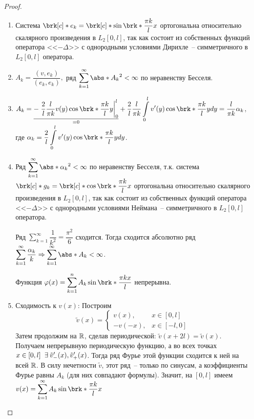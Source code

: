 \begin{proof}
	\begin{enumerate}
		\item Система $\brk[c]*{e_k} = \brk[c]*{\sin\brk*{\dfrac{\pi k}{l}x}}$ ортогональна относительно скалярного произведения в $L_2 [0,l]$, так как состоит из собственных функций оператора <<$-\Delta$>> с однородными условиями Дирихле~-- симметричного в $L_2 [0,l]$ оператора.
		\item $A_k = \dfrac{(v,e_k)}{(e_k,e_k)},$ ряд $\displaystyle\sum\limits_{k=1}^{\infty} \abs*{A_k}^2 < \infty$ по неравенству Бесселя.
		\item $A_k = \underset{=0}{\underline{-\left.\dfrac{2}{l} \dfrac{l}{\pi k} v(y) \cos\brk*{\dfrac{\pi k}{l}y}\right|_0^l}} + \dfrac{2}{l} \dfrac{l}{\pi k} \displaystyle\int\limits_0^l v'(y) \cos\brk*{\dfrac{\pi k}{l}y}dy = \dfrac{l}{\pi k} \alpha_k$, где $\alpha_k = \dfrac{2}{l} \displaystyle\int\limits_0^l v'(y) \cos\brk*{\dfrac{\pi k}{l}y}dy$.
		\item Ряд $\displaystyle\sum\limits_{k=1}^{\infty} \abs*{\alpha_k}^2 < \infty$ по неравенству Бесселя, т.к. система $\brk[c]*{g_k} = \brk[c]*{\cos\brk*{\dfrac{\pi k}{l}x}}$ ортогональна относительно скалярного произведения в $L_2 [0,l]$, так как состоит из собственных функций оператора <<$-\Delta$>> с однородными условиями Неймана~-- симметричного в $L_2 [0,l]$ оператора.

		Ряд $\displaystyle\sum\limits_{k=1}^{\infty} \dfrac{1}{k^2} = \dfrac{\pi^2}{6}$ сходится. Тогда сходится абсолютно ряд $\displaystyle\sum\limits_{k=1}^{\infty} \dfrac{\alpha_k}{k} \Rightarrow \displaystyle\sum\limits_{k=1}^{\infty} \abs*{A_k} < \infty$. 

		Функция $\varphi(x) = \displaystyle\sum\limits_{k=1}^{n} A_k \sin\brk*{\dfrac{\pi k x}{l}}$ непрерывна.
		\item Сходимость к $v(x)$: Построим
			\begin{equation*}
				\tilde{v}(x) = \begin{cases} v(x), & x \in [0,l] \\ -v(-x), & x \in [-l,0] \end{cases}
			\end{equation*}
			Затем продолжим на $\mathbb{R}$, сделав периодической: $\tilde{v}(x+2l) = \tilde{v}(x)$.
			Получаем непрерывную периодическую функцию, а во всех точках $x \in [0,l] \;\;\exists\: \tilde{v}'_-(x), \tilde{v}'_+(x)$. Тогда ряд Фурье этой функции сходится к ней на всей $\mathbb{R}$. В силу нечетности $\tilde{v}$, этот ряд~-- только по синусам, а коэффициенты Фурье равны $A_k$ (для них совпадают формулы). Значит, на $[0,l]$ имеем $v(x) = \displaystyle\sum\limits_{k=1}^{\infty} A_k \sin\brk*{\dfrac{\pi k}{l}x}$
	\end{enumerate}
\end{proof}
